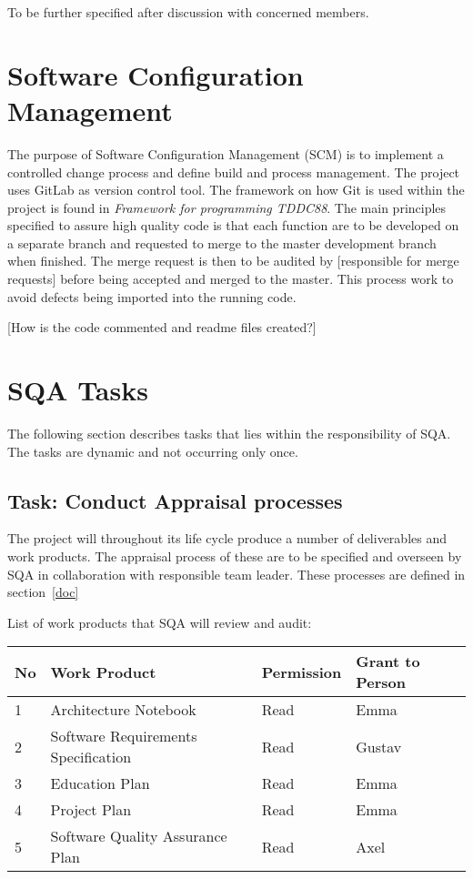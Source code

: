 \documentclass{article}
\begin{document}
	To be further specified after discussion with concerned members.
	
	\section{Software Configuration Management}
	The purpose of Software Configuration Management (SCM) is to implement a controlled change process and define build and process management. The project uses GitLab as version control tool. The framework on how Git is used within the project is found in \textit{Framework for programming TDDC88}. The main principles specified to assure high quality code is that each function are to be developed on a separate branch and requested to merge to the master development branch when finished. The merge request is then to be audited by [responsible for merge requests] before being accepted and merged to the master. This process work to avoid defects being imported into the running code.
	
	[How is the code commented and readme files created?]

	\section{SQA Tasks}
	The following section describes tasks that lies within the responsibility of SQA. The tasks are dynamic and not occurring only once.  
	
	\subsection{Task: Conduct Appraisal processes}
	The project will throughout its life cycle produce a number of deliverables and work products. The appraisal process of these are to be specified and overseen by SQA in collaboration with responsible team leader. These processes are defined in section~\ref{doc} 
	
	List of work products that SQA will review and audit:
	
	\begin{tabular}{|l|l|l|l|}
		\hline	
		No & Work Product & Permission & Grant to Person \\
		\hline	
		\hline
		1   & Architecture Notebook	& Read	& Emma \\
		2	& Software Requirements Specification	& Read & Gustav \\
		3	& Education Plan		& Read	& Emma \\
		4	& Project Plan			& Read	& Emma \\
		5	& Software Quality Assurance Plan		& Read	& Axel \\
	
		
		\hline
	\end{tabular}
	
\end{document}
